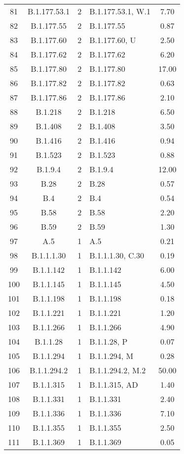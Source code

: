 \begin{longtable}[l]{cccP{4cm}c}
  81 & B.1.177.53.1 &   2 & B.1.177.53.1, W.1 & 7.70 \\ 
  82 & B.1.177.55 &   2 & B.1.177.55 & 0.87 \\ 
  83 & B.1.177.60 &   2 & B.1.177.60, U & 2.50 \\ 
  84 & B.1.177.62 &   2 & B.1.177.62 & 6.20 \\ 
  85 & B.1.177.80 &   2 & B.1.177.80 & 17.00 \\ 
  86 & B.1.177.82 &   2 & B.1.177.82 & 0.63 \\ 
  87 & B.1.177.86 &   2 & B.1.177.86 & 2.10 \\ 
  88 & B.1.218 &   2 & B.1.218 & 6.50 \\ 
  89 & B.1.408 &   2 & B.1.408 & 3.50 \\ 
  90 & B.1.416 &   2 & B.1.416 & 0.94 \\ 
  91 & B.1.523 &   2 & B.1.523 & 0.88 \\ 
  92 & B.1.9.4 &   2 & B.1.9.4 & 12.00 \\ 
  93 & B.28 &   2 & B.28 & 0.57 \\ 
  94 & B.4 &   2 & B.4 & 0.54 \\ 
  95 & B.58 &   2 & B.58 & 2.20 \\ 
  96 & B.59 &   2 & B.59 & 1.30 \\ 
  97 & A.5 &   1 & A.5 & 0.21 \\ 
  98 & B.1.1.1.30 &   1 & B.1.1.1.30, C.30 & 0.19 \\ 
  99 & B.1.1.142 &   1 & B.1.1.142 & 6.00 \\ 
  100 & B.1.1.145 &   1 & B.1.1.145 & 4.50 \\ 
  101 & B.1.1.198 &   1 & B.1.1.198 & 0.18 \\ 
  102 & B.1.1.221 &   1 & B.1.1.221 & 1.20 \\ 
  103 & B.1.1.266 &   1 & B.1.1.266 & 4.90 \\ 
  104 & B.1.1.28 &   1 & B.1.1.28, P & 0.07 \\ 
  105 & B.1.1.294 &   1 & B.1.1.294, M & 0.28 \\ 
  106 & B.1.1.294.2 &   1 & B.1.1.294.2, M.2 & 50.00 \\ 
  107 & B.1.1.315 &   1 & B.1.1.315, AD & 1.40 \\ 
  108 & B.1.1.331 &   1 & B.1.1.331 & 2.40 \\ 
  109 & B.1.1.336 &   1 & B.1.1.336 & 7.10 \\ 
  110 & B.1.1.355 &   1 & B.1.1.355 & 2.50 \\ 
  111 & B.1.1.369 &   1 & B.1.1.369 & 0.05 \\ 

\end{longtable}
